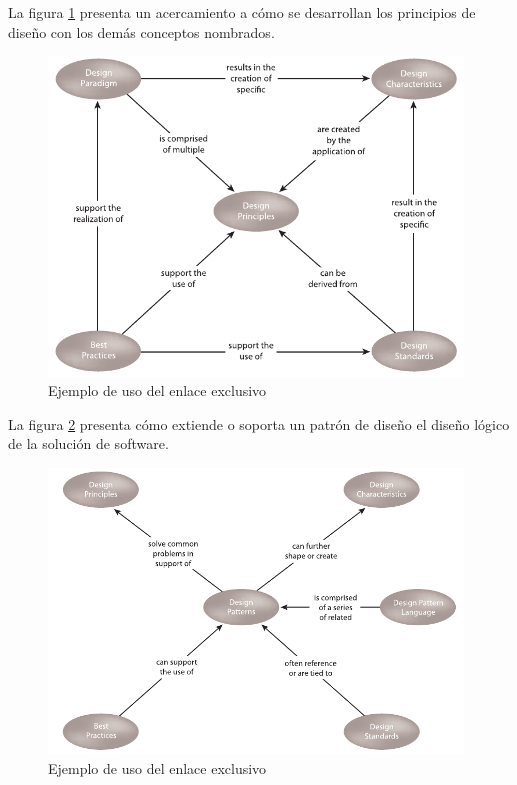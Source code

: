La figura \ref{fig:uno} presenta un acercamiento a cómo se desarrollan los principios de diseño con los demás conceptos nombrados.

\begin{figure}[!htb]
  \begin{center}
    \includegraphics[width=11cm]{./imagenes/1.png}
    \caption{Ejemplo de uso del enlace exclusivo}
    \label{fig:uno}
  \end{center}
\end{figure}

La figura \ref{fig:dos} presenta cómo extiende o soporta un patrón de diseño el diseño lógico de la solución de software.

\begin{figure}[!htb]
  \begin{center}
    \includegraphics[width=11cm]{./imagenes/2.png}
    \caption{Ejemplo de uso del enlace exclusivo}
    \label{fig:dos}
  \end{center}
\end{figure}

